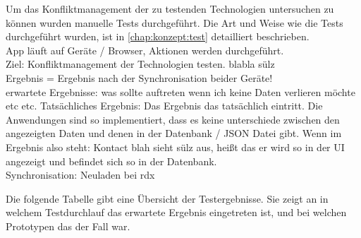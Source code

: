 Um das Konfliktmanagement der zu testenden Technologien untersuchen zu können wurden manuelle Tests durchgeführt.
Die Art und Weise wie die Tests durchgeführt wurden, ist in \autoref{chap:konzept:test} detailliert beschrieben.\\
App läuft auf Geräte / Browser, Aktionen werden durchgeführt.\\
Ziel: Konfliktmanagement der Technologien testen. blabla sülz\\
Ergebnis = Ergebnis nach der Synchronisation beider Geräte!\\ 
erwartete Ergebnisse: was sollte auftreten wenn ich keine Daten verlieren möchte etc etc.
Tatsächliches Ergebnis: Das Ergebnis das tatsächlich eintritt.
Die Anwendungen sind so implementiert, dass es keine unterschiede zwischen den angezeigten Daten und denen in der Datenbank / JSON Datei gibt.
Wenn im Ergebnis also steht: Kontact blah sieht sülz aus, heißt das er wird so in der UI angezeigt und befindet sich so in der Datenbank.\\
Synchronisation: Neuladen bei rdx
% 
% 
% 

%
%

%
%
%

% 
% 
% 
% 
Die folgende Tabelle gibt eine Übersicht der Testergebnisse. Sie zeigt an in welchem Testdurchlauf das erwartete Ergebnis eingetreten ist, und bei welchen Prototypen das der Fall war.

